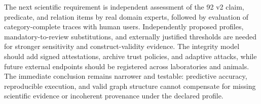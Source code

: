 The next scientific requirement is independent assessment of the 92 v2 claim, predicate, and relation items by real domain experts, followed by evaluation of category-complete traces with human users. Independently proposed profiles, mandatory-to-review substitutions, and externally justified thresholds are needed for stronger sensitivity and construct-validity evidence. The integrity model should add signed attestations, archive trust policies, and adaptive attacks, while future external endpoints should be registered across laboratories and animals. The immediate conclusion remains narrower and testable: predictive accuracy, reproducible execution, and valid graph structure cannot compensate for missing scientific evidence or incoherent provenance under the declared profile.
